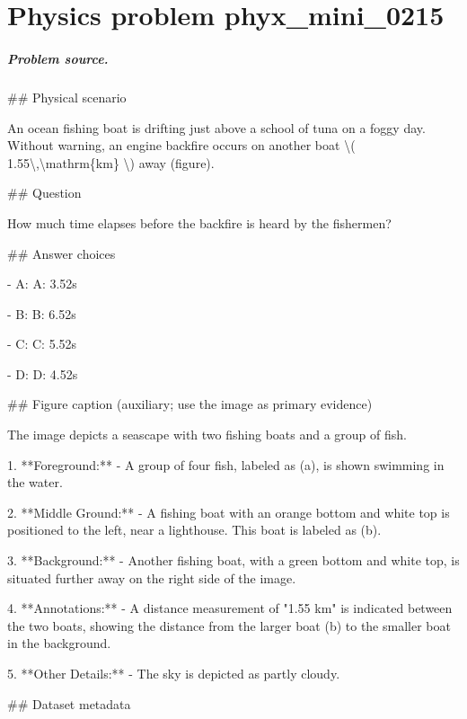 
\chapter{Physics problem phyx\_mini\_0215}
\label{ch:PhyXMiniProblems_problem_phyx_mini_0215}

\paragraph{Problem source.}
\#\# Physical scenario

An ocean fishing boat is drifting just above a school of tuna on a foggy day. Without warning, an engine backfire occurs on another boat \textbackslash{}( 1.55\textbackslash{},\textbackslash{}mathrm\{km\} \textbackslash{}) away (figure).

\#\# Question

How much time elapses before the backfire is heard by the fishermen?

\#\# Answer choices

- A: A: 3.52s

- B: B: 6.52s

- C: C: 5.52s

- D: D: 4.52s

\#\# Figure caption (auxiliary; use the image as primary evidence)

The image depicts a seascape with two fishing boats and a group of fish. 

1. **Foreground:**
   - A group of four fish, labeled as (a), is shown swimming in the water.

2. **Middle Ground:**
   - A fishing boat with an orange bottom and white top is positioned to the left, near a lighthouse. This boat is labeled as (b).

3. **Background:**
   - Another fishing boat, with a green bottom and white top, is situated further away on the right side of the image.

4. **Annotations:**
   - A distance measurement of "1.55 km" is indicated between the two boats, showing the distance from the larger boat (b) to the smaller boat in the background.

5. **Other Details:**
   - The sky is depicted as partly cloudy.

\#\# Dataset metadata

